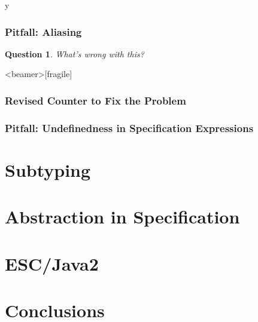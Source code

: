 \if y\MAKEHANDOUTS \documentclass[compress,landscape,handout]{beamer}
\newtheorem*{question}{Question}
\begin{document}
\begin{frame}[fragile]
\frametitle{Pitfall: Aliasing}

\begin{question}
What's wrong with this? 

\rm

\end{question}
\end{frame}

\begin{frame}<beamer>[fragile]
\frametitle{Revised Counter to Fix the Problem}


\end{frame}

\begin{frame}
\frametitle{Pitfall: Undefinedness in Specification Expressions}
\end{frame}


\section{Subtyping}

\section[Abstraction]{Abstraction in Specification}

\section[ESC]{ESC/Java2}

\section*{Conclusions}

\end{document}
